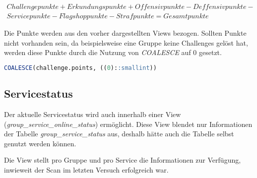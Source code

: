 \begin{multline*}
Challengepunkte + Erkundungspunkte + Offensivpunkte - Deffensivpunkte - \\ Servicepunkte - Flagshoppunkte - Strafpunkte = Gesamtpunkte
\end{multline*}

Die Punkte werden aus den vorher dargestellten Views bezogen. Sollten Punkte nicht \linebreak vorhanden sein, da beispielsweise eine Gruppe keine Challenges gelöst hat, werden diese Punkte durch die Nutzung von \textit{COALESCE} auf 0 gesetzt.

\begin{lstlisting}[frame=single, language=sql, caption={SQL Ersetzen nicht vorhandener Punkte}, captionpos=b, label={lst:database-total-points-0}]
COALESCE(challenge.points, ((0)::smallint)) 
\end{lstlisting}

\subsection{Servicestatus}
Der aktuelle Servicestatus wird auch innerhalb einer View (\textit{group\_service\_online\_status}) \linebreak ermöglicht. Diese View blendet nur Informationen der Tabelle \textit{group\_service\_status} aus, \linebreak deshalb hätte auch die Tabelle selbst genutzt werden können.

Die View stellt pro Gruppe und pro Service die Informationen zur Verfügung, inwieweit der Scan im letzten Versuch erfolgreich war.